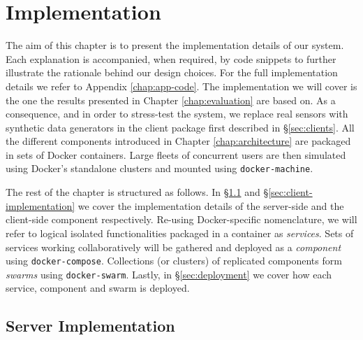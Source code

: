 \chapter{Implementation} \label{chap:implementation}

The aim of this chapter is to present the implementation details of our system.
Each explanation is accompanied, when required, by code snippets to further illustrate the rationale behind our design choices.
For the full implementation details we refer to Appendix \ref{chap:app-code}.
The implementation we will cover is the one the results presented in Chapter \ref{chap:evaluation} are based on.
As a consequence, and in order to stress-test the system, we replace real sensors with synthetic data generators in the client package first described in \S\ref{sec:clients}.
All the different components introduced in Chapter \ref{chap:architecture} are packaged in sets of Docker containers.
Large fleets of concurrent users are then simulated using Docker's standalone clusters and mounted using \texttt{docker-machine}.

The rest of the chapter is structured as follows.
In \S\ref{sec:server-implementation} and \S\ref{sec:client-implementation} we cover the implementation details of the server-side and the client-side component respectively.
Re-using Docker-specific nomenclature, we will refer to logical isolated functionalities packaged in a container as \emph{services}.
Sets of services working collaboratively will be gathered and deployed as a \emph{component} using \texttt{docker-compose}.
Collections (or clusters) of replicated components form \emph{swarms} using \texttt{docker-swarm}.
Lastly, in \S\ref{sec:deployment} we cover how each service, component and swarm is deployed.

\section{Server Implementation} \label{sec:server-implementation}


